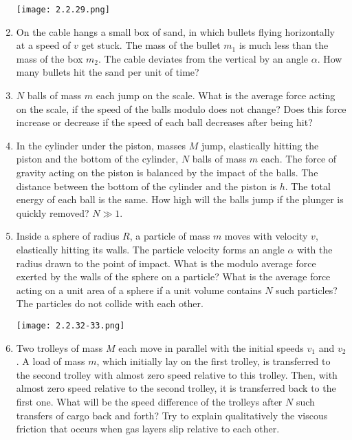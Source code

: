 \documentclass{article}
\begin{document}
\begin{enumerate}[label=2.2.\arabic*]
\begin{center}
    \texttt{[image: 2.2.29.png]}
\end{center}

\item On the cable hangs a small box of sand, in which bullets flying horizontally at a speed of $v$ get stuck. The mass of the bullet $m_1$ is much less than the mass of the box $m_2$. The cable deviates from the vertical by an angle $\alpha$. How many bullets hit the sand per unit of time?

\item $N$ balls of mass $m$ each jump on the scale. What is the average force acting on the scale, if the speed of the balls modulo does not change? Does this force increase or decrease if the speed of each ball decreases after being hit?

\item In the cylinder under the piston, masses $M$ jump, elastically hitting the piston and the bottom of the cylinder, $N$ balls of mass $m$ each. The force of gravity acting on the piston is balanced by the impact of the balls. The distance between the bottom of the cylinder and the piston is $h$. The total energy of each ball is the same. How high will the balls jump if the plunger is quickly removed? $N \gg 1$.

\item Inside a sphere of radius $R$, a particle of mass $m$ moves with velocity $v$, elastically hitting its walls. The particle velocity forms an angle $\alpha$ with the radius drawn to the point of impact. What is the modulo average force exerted by the walls of the sphere on a particle? What is the average force acting on a unit area of a sphere if a unit volume contains $N$ such particles? The particles do not collide with each other.

\begin{center}
    \texttt{[image: 2.2.32-33.png]}
\end{center}

\item Two trolleys of mass $M$ each move in parallel with the initial speeds $v_1$ and $v_2$. A load of mass $m$, which initially lay on the first trolley, is transferred to the second trolley with almost zero speed relative to this trolley. Then, with almost zero speed relative to the second trolley, it is transferred back to the first one. What will be the speed difference of the trolleys after $N$ such transfers of cargo back and forth? Try to explain qualitatively the viscous friction that occurs when gas layers slip relative to each other.


\end{enumerate}
\end{document}
